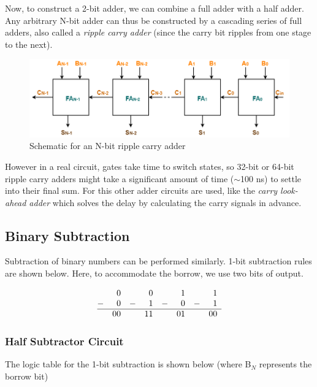 Now, to construct a 2-bit adder, we can combine a full adder with a half adder. Any arbitrary N-bit adder can thus be constructed by a cascading series of full adders, also called a \textit{ripple carry adder} (since the carry bit ripples from one stage to the next).

\begin{figure}[H]
    \centering
    \includegraphics[width=0.9\columnwidth]{images/n-bit.png}
    \caption{Schematic for an N-bit ripple carry adder}
\end{figure}

However in a real circuit, gates take time to switch states, so 32-bit or 64-bit ripple carry adders might take a significant amount of time ($\sim$100 ns) to settle into their final sum. For this other adder circuits are used, like the \textit{carry look-ahead adder} which solves the delay by calculating the carry signals in advance.


\subsection*{Binary Subtraction}
Subtraction of binary numbers can be performed similarly. 1-bit subtraction rules are shown below. Here, to accommodate the borrow, we use two bits of output.

\[
\begin{array}{@{}cr@{\,\,\,\,\,\,}rr@{\,\,\,\,\,\,}rr@{\,\,\,\,\,\,}rr}
    & 0 & & 0 & & 1 & & 1\\
-  & 0 & - & 1& - & 0& - & 1\\ \hline
  & 00 & & 11 && 01 && 00
\end{array}
\]

\subsubsection*{Half Subtractor Circuit}

The logic table for the 1-bit subtraction is shown below (where B$_N$ represents the borrow bit)

